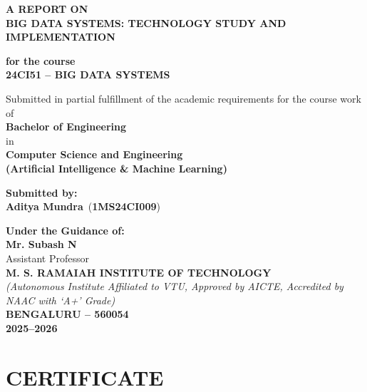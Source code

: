 \documentclass[12pt,a4paper]{report}
\newcommand{\ProjectTitle}{BIG DATA SYSTEMS: TECHNOLOGY STUDY AND IMPLEMENTATION}
\newcommand{\CourseCode}{24CI51 -- BIG DATA SYSTEMS}
\newcommand{\AcademicYear}{2025--2026}
\newcommand{\StudentOne}{Aditya Mundra}
\newcommand{\USNOne}{1MS24CI009}
\newcommand{\GuideOne}{Mr. Subash N}
\newcommand{\GuideDesignation}{Assistant Professor}
\begin{document}
\begin{titlepage}
\centering
\thispagestyle{empty}

\vspace*{0.2cm}
{\bfseries\Large A REPORT ON\\[0.3cm]}
{\bfseries\LARGE \ProjectTitle\\[0.5cm]}

{\bfseries for the course\\[0.2cm]}
{\bfseries \CourseCode\\[0.6cm]}

Submitted in partial fulfillment of the academic requirements
for the course work of\\[0.2cm]
{\bfseries Bachelor of Engineering\\}
in\\
{\bfseries Computer Science and Engineering\\[0.2cm]}
{\bfseries (Artificial Intelligence \& Machine Learning)\\[0.6cm]}

{\bfseries Submitted by:\\[0.2cm]}
{\large \textbf{\StudentOne}\ (\textbf{\USNOne})\\[0.8cm]}

{\bfseries Under the Guidance of:\\[0.2cm]}
{\large \textbf{\GuideOne}\\[0.1cm]}
\GuideDesignation\\[0.8cm]

{\bfseries M. S. RAMAIAH INSTITUTE OF TECHNOLOGY\\}
\textit{(Autonomous Institute Affiliated to VTU, Approved by AICTE, Accredited by NAAC with `A+' Grade)}\\
{\bfseries BENGALURU -- 560054\\}
{\bfseries \AcademicYear}

\end{titlepage}

\setcounter{page}{1}

\chapter*{CERTIFICATE}
\end{document}
